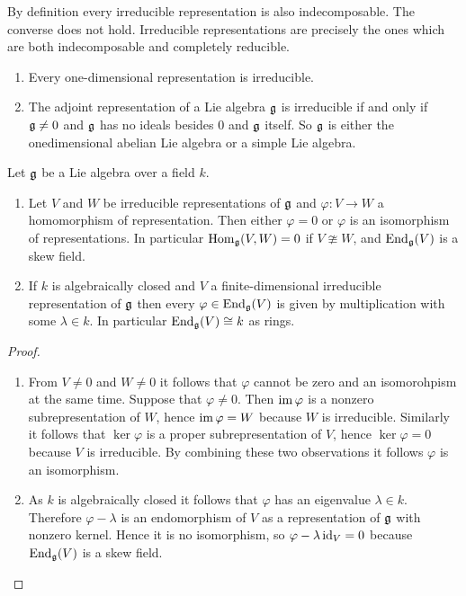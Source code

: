 \begin{remark}
 By definition every irreducible representation is also indecomposable. The converse does not hold. Irreducible representations are precisely the ones which are both indecomposable and completely reducible.
\end{remark}


\begin{example}
 \begin{enumerate}[leftmargin=*]
  \item
   Every one-dimensional representation is irreducible.
  \item
   The adjoint representation of a Lie algebra $\mathfrak{g}$ is irreducible if and only if $\mathfrak{g} \neq 0$ and $\mathfrak{g}$ has no ideals besides $0$ and $\mathfrak{g}$ itself. So $\mathfrak{g}$ is either the onedimensional abelian Lie algebra or a simple Lie algebra.   
 \end{enumerate}
\end{example}


\begin{lemma}[Schur]
 Let $\mathfrak{g}$ be a Lie algebra over a field $k$.
 \begin{enumerate}
  \item
   Let $V$ and $W$ be irreducible representations of $\mathfrak{g}$ and $\varphi \colon V \to W$ a homomorphism of representation. Then either $\varphi = 0$ or $\varphi$ is an isomorphism of representations. In particular $\operatorname{Hom}_{\mathfrak{g}}(V,W) = 0$ if $V \ncong W$, and $\operatorname{End}_{\mathfrak{g}}(V)$ is a skew field.
  \item
   If $k$ is algebraically closed and $V$ a finite-dimensional irreducible representation of $\mathfrak{g}$ then every $\varphi \in \operatorname{End}_{\mathfrak{g}}(V)$ is given by multiplication with some $\lambda \in k$. In particular $\operatorname{End}_{\mathfrak{g}}(V) \cong k$ as rings.
 \end{enumerate}
\end{lemma}
\begin{proof}
 \begin{enumerate}[leftmargin=*]
  \item
   From $V \neq 0$ and $W \neq 0$ it follows that $\varphi$ cannot be zero and an isomorohpism at the same time. Suppose that $\varphi \neq 0$. Then $\operatorname{im} \varphi$ is a nonzero subrepresentation of $W$, hence $\operatorname{im} \varphi = W$ because $W$ is irreducible. Similarly it follows that $\ker \varphi$ is a proper subrepresentation of $V$, hence $\ker \varphi = 0$ because $V$ is irreducible. By combining these two observations it follows $\varphi$ is an isomorphism.
  \item
   As $k$ is algebraically closed it follows that $\varphi$ has an eigenvalue $\lambda \in k$. Therefore $\varphi - \lambda$ is an endomorphism of $V$ as a representation of $\mathfrak{g}$ with nonzero kernel. Hence it is no isomorphism, so $\varphi - \lambda \operatorname{id}_V = 0$ because $\operatorname{End}_{\mathfrak{g}}(V)$ is a skew field.
  \qedhere
 \end{enumerate}
\end{proof}








